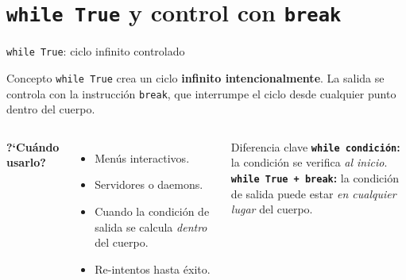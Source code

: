 \documentclass[aspectratio=169,xcolor=dvipsnames]{beamer}
\begin{document}
\section{\texttt{while True} y control con \texttt{break}}

\begin{frame}{\texttt{while True}: ciclo infinito controlado}
    \begin{block}{Concepto}
        \texttt{while True} crea un ciclo \textbf{infinito intencionalmente}.
        La salida se controla con la instrucci\'on \texttt{break}, que interrumpe
        el ciclo desde cualquier punto dentro del cuerpo.
    \end{block}

    \vspace{0.3cm}
    \begin{columns}
        \textbf{?`Cu\'ando usarlo?}
        \begin{itemize}
            \item Men\'us interactivos.
            \item Servidores o daemons.
            \item Cuando la condici\'on de salida se calcula \emph{dentro} del cuerpo.
            \item Re-intentos hasta \'exito.
        \end{itemize}

        \begin{alertblock}{Diferencia clave}
            \textbf{\texttt{while condici\'on}:} la condici\'on se verifica \emph{al inicio}.\\[4pt]
            \textbf{\texttt{while True + break}:} la condici\'on de salida puede estar
            \emph{en cualquier lugar} del cuerpo.
        \end{alertblock}
    \end{columns}
\end{frame}
\end{document}
